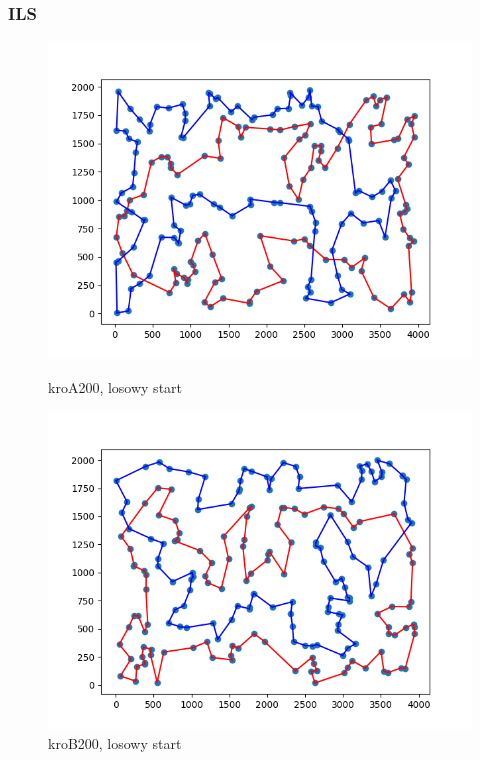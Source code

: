 \documentclass[11pt]{article}
\begin{document}
\subsubsection{ILS}

\begin{figure}[H]
    \begin{minipage}[t]{0.45\textwidth}
        \centering
        \includegraphics[width=\linewidth]{best_paths/kroA200/ILS}
        \caption{kroA200, losowy start}
    \end{minipage}
    \hfill
    \begin{minipage}[t]{0.45\textwidth}
        \centering
        \includegraphics[width=\linewidth]{best_paths/kroB200/ILS}
        \caption{kroB200, losowy start}
    \end{minipage}\label{fig:figure1}
\end{figure}
\end{document}
